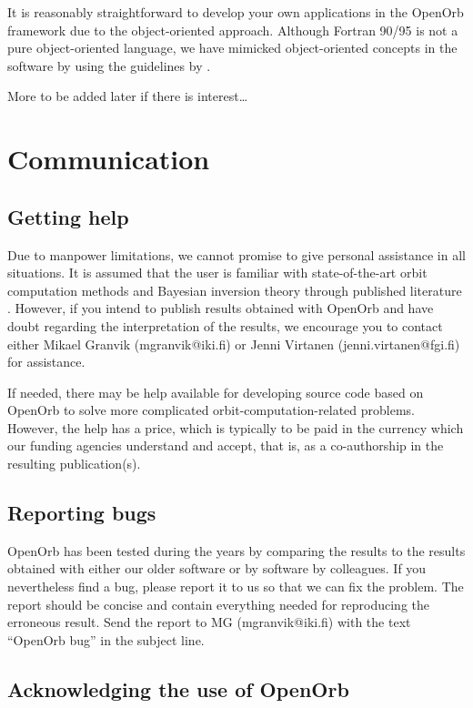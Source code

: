 \documentclass[12pt,english,twoside,a4paper]{report}
\begin{document}
It is reasonably straightforward to develop your own applications in
the OpenOrb framework due to the object-oriented approach. Although
Fortran 90/95 is not a pure object-oriented language, we have mimicked
object-oriented concepts in the software by using the guidelines by
.

More to be added later if there is interest\ldots


\chapter{Communication}

\section{Getting help}

Due to manpower limitations, we cannot promise to give personal
assistance in all situations. It is assumed that the user is familiar
with state-of-the-art orbit computation methods and Bayesian inversion
theory through published literature
. However,
if you intend to publish results obtained with OpenOrb and have doubt
regarding the interpretation of the results, we encourage you to
contact either Mikael Granvik (mgranvik@iki.fi) or Jenni Virtanen
(jenni.virtanen@fgi.fi) for assistance.

If needed, there may be help available for developing source code
based on OpenOrb to solve more complicated orbit-computation-related
problems. However, the help has a price, which is typically to be paid
in the currency which our funding agencies understand and accept, that
is, as a co-authorship in the resulting publication(s).

\section{Reporting bugs}

OpenOrb has been tested during the years by comparing the results to
the results obtained with either our older software or by software by
colleagues. If you nevertheless find a bug, please report it to us so
that we can fix the problem. The report should be concise and contain
everything needed for reproducing the erroneous result. Send the
report to MG (mgranvik@iki.fi) with the text ``OpenOrb bug'' in the
subject line.

\section{Acknowledging the use of OpenOrb}
\end{document}
